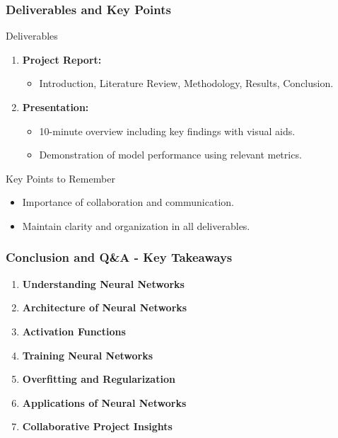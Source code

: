 \documentclass[aspectratio=169]{beamer}
\begin{document}
\begin{frame}[fragile]
    \frametitle{Deliverables and Key Points}
    \begin{block}{Deliverables}
        \begin{enumerate}
            \item \textbf{Project Report:}
            \begin{itemize}
                \item Introduction, Literature Review, Methodology, Results, Conclusion.
            \end{itemize}
            \item \textbf{Presentation:}
            \begin{itemize}
                \item 10-minute overview including key findings with visual aids.
                \item Demonstration of model performance using relevant metrics.
            \end{itemize}
        \end{enumerate}
    \end{block}
    
    \begin{block}{Key Points to Remember}
        \begin{itemize}
            \item Importance of collaboration and communication.
            \item Maintain clarity and organization in all deliverables.
        \end{itemize}
    \end{block}
\end{frame}

\begin{frame}[fragile]
    \frametitle{Conclusion and Q\&A - Key Takeaways}
    
    \begin{enumerate}
        \item \textbf{Understanding Neural Networks}
        \item \textbf{Architecture of Neural Networks}
        \item \textbf{Activation Functions}
        \item \textbf{Training Neural Networks}
        \item \textbf{Overfitting and Regularization}
        \item \textbf{Applications of Neural Networks}
        \item \textbf{Collaborative Project Insights}
    \end{enumerate}
\end{frame}
\end{document}
